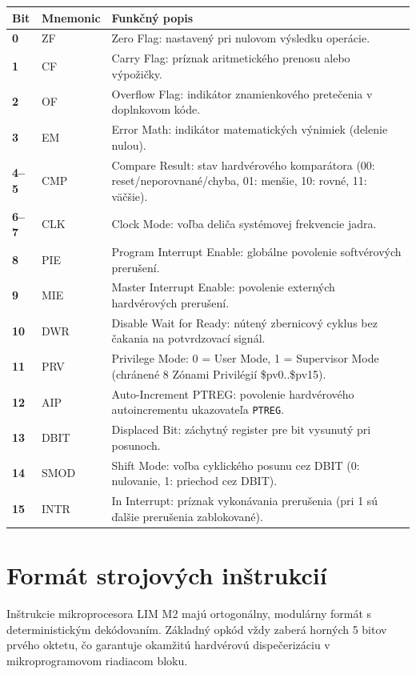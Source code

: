 \documentclass[11pt,a4paper]{article}
\newcommand{\reg}[1]{\texttt{#1}}
\begin{document}
\begin{tabularx}{\textwidth}{>{\bfseries}p{14mm}>{\ttfamily}p{23mm}X}
\toprule
Bit & Mnemonic & Funkčný popis \\
\midrule
0    & ZF   & Zero Flag: nastavený pri nulovom výsledku operácie. \\
1    & CF   & Carry Flag: príznak aritmetického prenosu alebo výpožičky. \\
2    & OF   & Overflow Flag: indikátor znamienkového pretečenia v doplnkovom kóde. \\
3    & EM   & Error Math: indikátor matematických výnimiek (delenie nulou). \\
4--5 & CMP  & Compare Result: stav hardvérového komparátora (00: reset/neporovnané/chyba, 01: menšie, 10: rovné, 11: väčšie). \\
6--7 & CLK  & Clock Mode: voľba deliča systémovej frekvencie jadra. \\
8    & PIE  & Program Interrupt Enable: globálne povolenie softvérových prerušení. \\
9    & MIE  & Master Interrupt Enable: povolenie externých hardvérových prerušení. \\
10   & DWR  & Disable Wait for Ready: nútený zbernicový cyklus bez čakania na potvrdzovací signál. \\
11   & PRV  & Privilege Mode: 0 = User Mode, 1 = Supervisor Mode (chránené 8 Zónami Privilégií \$pv0..\$pv15). \\
12   & AIP  & Auto-Increment PTREG: povolenie hardvérového autoincrementu ukazovateľa \reg{PTREG}. \\
13   & DBIT & Displaced Bit: záchytný register pre bit vysunutý pri posunoch. \\
14   & SMOD & Shift Mode: voľba cyklického posunu cez DBIT (0: nulovanie, 1: priechod cez DBIT). \\
15   & INTR & In Interrupt: príznak vykonávania prerušenia (pri 1 sú ďalšie prerušenia zablokované). \\
\bottomrule
\end{tabularx}

\section{Formát strojových inštrukcií}
Inštrukcie mikroprocesora LIM M2 majú ortogonálny, modulárny formát s deterministickým dekódovaním. 
Základný opkód vždy zaberá horných 5 bitov prvého oktetu, čo garantuje okamžitú hardvérovú dispečerizáciu v mikroprogramovom riadiacom bloku.
\end{document}
